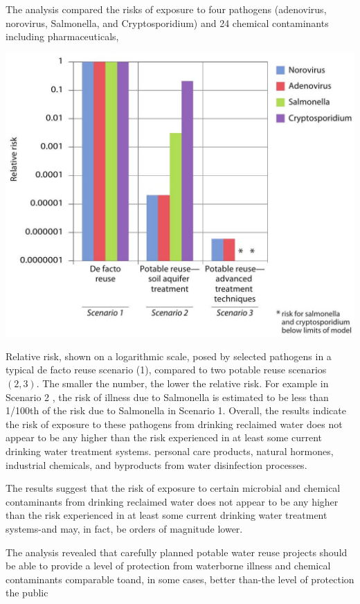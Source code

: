 \documentclass[10pt]{article}
\begin{document}
The analysis compared the risks of exposure to four pathogens (adenovirus, norovirus, Salmonella, and Cryptosporidium) and 24 chemical contaminants including pharmaceuticals,

\includegraphics[max width=\textwidth]{2022_11_05_93277ca2de7ec5580550g-09}

Relative risk, shown on a logarithmic scale, posed by selected pathogens in a typical de facto reuse scenario (1), compared to two potable reuse scenarios $(2,3)$. The smaller the number, the lower the relative risk. For example in Scenario 2 , the risk of illness due to Salmonella is estimated to be less than 1/100th of the risk due to Salmonella in Scenario 1. Overall, the results indicate the risk of exposure to these pathogens from drinking reclaimed water does not appear to be any higher than the risk experienced in at least some current drinking water treatment systems. personal care products, natural hormones, industrial chemicals, and byproducts from water disinfection processes.

The results suggest that the risk of exposure to certain microbial and chemical contaminants from drinking reclaimed water does not appear to be any higher than the risk experienced in at least some current drinking water treatment systems-and may, in fact, be orders of magnitude lower.

The analysis revealed that carefully planned potable water reuse projects should be able to provide a level of protection from waterborne illness and chemical contaminants comparable toand, in some cases, better than-the level of protection the public
\end{document}
